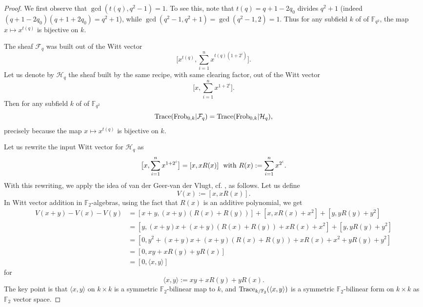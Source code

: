 \documentclass[11pt]{amsart}
\theoremstyle{plain}
\theoremstyle{definition}
\numberwithin{thm}{section}
\numberwithin{equation}{thm}
\newcommand{\Trace}{{\rm Trace}}
\newcommand{\sF}{{\mathcal F}}
\newcommand{\sH}{{\mathcal H}}
\newcommand{\F}{{\mathbb F}}
\newcommand{\0}{\emptyset}
\newcommand{\Frob}{\mathrm{Frob}}
\begin{document}
\begin{proof}
We first observe that $\gcd(t(q),q^2-1)=1$. To see this, note that $t(q)=q+1-2q_0$ divides $q^2+1$ (indeed $(q+1-2q_0)(q+1+2q_0)=q^2+1$),
while $\gcd(q^2-1,q^2+1) =\gcd(q^2-1,2)=1$. Thus for any subfield $k$ of of $\F_{q^2}$, the map $x \mapsto x^{t(q)}$ is bijective on $k$. 

The sheaf $\sF_q$ was built out of the Witt vector 
$$\bigl[x^{t(q)},\sum_{i=1}^n x^{t(q)(1+2^i)}\bigr].$$
Let us denote by $\sH_q$ the sheaf built by the same recipe, with same clearing factor, out of the Witt vector
$$\bigl[x,\sum_{i=1}^n x^{1+2^i}\bigr].$$
Then for any subfield $k$ of of $\F_{q^2}$
\begin{equation}\label{fq-hq1}
  \Trace(\Frob_{0,k} |\sF_q) =\Trace(\Frob_{0,k}|\sH_q),
\end{equation}  
precisely because the map $x \mapsto x^{t(q)}$ is bijective on $k$. 

Let us rewrite the input Witt vector for $\sH_q$ as
\begin{equation}\label{fq-hq2}
  \bigl[x,\sum_{i=1}^n x^{1+2^i}\bigr] =[x,xR(x)]\ {\rm\ with\ }R(x):=\sum_{i=1}^n x^{2^i}.
\end{equation}  
With this rewriting, we apply the idea of van der Geer-van der Vlugt, cf. \cite[\S5]{vdG-vdV}, as follows.
Let us define
\begin{equation}\label{fq-hq3}
  V(x):=[x,xR(x)].
\end{equation}  
In Witt vector addition in $\F_2$-algebras, using the fact that $R(x)$ is an additive polynomial, we get
$$\begin{aligned}V(x+y)-V(x)-V(y) & = [x+y,(x+y)(R(x)+R(y))] +[x,xR(x)+x^2] +[y,yR(y)+y^2]\\
 & =[y,(x+y)x+(x+y)(R(x)+R(y)) + xR(x)+x^2] +[y,yR(y)+y^2]\\
 & =[0, y^2 + (x+y)x +(x+y)(R(x)+R(y)) + xR(x)+x^2+yR(y)+y^2]\\
& = [0, xy+xR(y)+yR(x)]\\
 &  =[0,\langle x,y \rangle]\end{aligned}$$
for 
\begin{equation}\label{fq-hq4}
  \langle x,y \rangle:=xy+xR(y)+yR(x).
\end{equation}  
The key point is that $\langle x,y \rangle$ on $k\times k$ is a symmetric $\F_2$-bilinear map to $k$, and $\Trace_{k/\F_2}(\langle x,y \rangle)$ is a symmetric $\F_2$-bilinear form on $k \times k$ as $\F_2$ vector space.


\end{proof}
\end{document}
